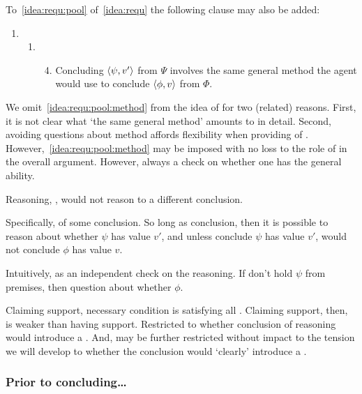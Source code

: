 \begin{note}
  To~\ref{idea:requ:pool} of~\autoref{idea:requ} the following clause may also be added:
  \begin{enumerate}[label=]
  \item
    \begin{enumerate}[label=]
    \item
      \begin{enumerate}[label=\roman*., ref=(\roman*), resume*=csIdeaCounter]
        \setcounter{enumiii}{3}
      \item
        \label{idea:requ:pool:method}
        Concluding \(\langle \psi, v' \rangle\) from \(\Psi\) involves the same general method the agent would use to conclude \(\langle \phi, v \rangle\) from \(\Phi\).
      \end{enumerate}
    \end{enumerate}
  \end{enumerate}
  We omit~\autoref{idea:requ:pool:method} from the idea of \csN{} for two (related) reasons.
  First, it is not clear what `the same general method' amounts to in detail.
  Second, avoiding questions about method affords flexibility when providing  of \zS{}.
  However,~\autoref{idea:requ:pool:method} may be imposed with no loss to the role of \zS{} in the overall argument.
  However, always a check on whether one has the general ability.
\end{note}

\begin{note}
  Reasoning, \support{}, would not reason to a different conclusion.

  Specifically, \requ{} of some conclusion.
  So long as conclusion, then it is possible to reason about whether \(\psi\) has value \(v'\), and unless conclude \(\psi\) has value \(v'\), would not conclude \(\phi\) has value \(v\).

  Intuitively, \requ{} as an independent check on the reasoning.
  If don't hold \(\psi\) from premises, then question about whether \(\phi\).

  Claiming support, necessary condition is satisfying all .
  Claiming support, then, is weaker than having support.
  Restricted to whether conclusion of reasoning would introduce a \requ{}.
  And, may be further restricted without impact to the tension we will develop to whether the conclusion would `clearly' introduce a \requ{}.
\end{note}

\subsubsection{Prior to concluding\dots}

